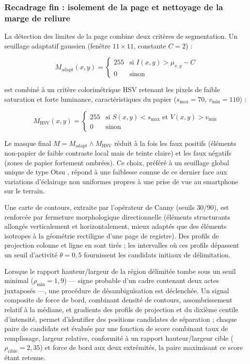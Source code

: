 \subsubsection*{Recadrage fin : isolement de la page et nettoyage de la marge de reliure}

La détection des limites de la page combine deux critères de segmentation. Un seuillage adaptatif gaussien (fenêtre $11\times11$, constante $C=2$) :

\begin{equation}
    M_{\text{adapt}}(x,y) = \begin{cases} 255 & \text{si } I(x,y) > \mu_{x,y} - C \\ 0 & \text{sinon} \end{cases}
\end{equation}

est combiné à un critère colorimétrique HSV retenant les pixels de faible saturation et forte luminance, caractéristiques du papier ($s_{\max}=70$, $v_{\min}=110$) :

\begin{equation}
    M_{\text{HSV}}(x,y) = \begin{cases} 255 & \text{si } S(x,y) < s_{\max} \text{ et } V(x,y) > v_{\min} \\ 0 & \text{sinon} \end{cases}
\end{equation}

Le masque final $M = M_{\text{adapt}} \wedge M_{\text{HSV}}$ réduit à la fois les faux positifs (éléments non-papier de faible contraste local mais de teinte claire) et les faux négatifs (zones de papier fortement ombrées).
Ce choix, préféré à un seuillage global unique de type Otsu \cite{otsu1979threshold}, répond à une faiblesse connue de ce dernier face aux variations d'éclairage non uniformes propres à une prise de vue au smartphone sur le terrain.

Une carte de contours, extraite par l'opérateur de Canny \cite{canny1986edge} (seuils $30$/$90$), est renforcée par fermeture morphologique directionnelle (éléments structurants allongés verticalement et horizontalement, mieux adaptés que des éléments isotropes à la géométrie rectiligne d'une page de registre).
Des profils de projection colonne et ligne en sont tirés ; les intervalles où ces profils dépassent un seuil d'activité $\theta=0{,}5$ fournissent les candidats initiaux de délimitation.

Lorsque le rapport hauteur/largeur de la région délimitée tombe sous un seuil minimal ($\rho_{\min}=1{,}9$) --- signe probable d'un cadre contenant deux actes juxtaposés ---, une procédure de désambiguïsation est déclenchée.
Un signal composite de force de bord, combinant densité de contours, assombrissement relatif à la médiane, et gradients des profils de projection et du dixième centile d'intensité, permet d'identifier des positions candidates de séparation ; chaque
paire de candidats est évaluée par une fonction de score combinant taux de remplissage, largeur relative, conformité à un rapport hauteur/largeur cible ($\rho_{\text{cible}}=2{,}35$) et force de bord aux deux extrémités, la paire maximisant ce score étant retenue.

